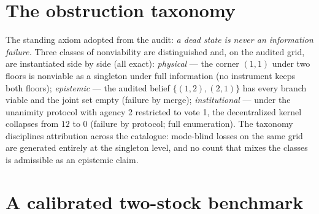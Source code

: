 \documentclass[10pt,twocolumn]{article}
\theoremstyle{plain}
\theoremstyle{definition}
\theoremstyle{remark}
\begin{document}
\section{The obstruction taxonomy}

The standing axiom adopted from the audit: \emph{a dead state is never an
information failure.} Three classes of nonviability are distinguished and,
on the audited grid, are instantiated side by side (all exact):
\emph{physical} --- the corner $(1,1)$ under two floors is nonviable as a
singleton under full information (no instrument keeps both floors);
\emph{epistemic} --- the audited belief $\{(1,2),(2,1)\}$ has every branch
viable and the joint set empty (failure by merge); \emph{institutional}
--- under the unanimity protocol with agency 2 restricted to vote 1, the
decentralized kernel collapses from $12$ to $0$ (failure by protocol;
full enumeration). The taxonomy disciplines attribution across the
catalogue: mode-blind losses on the same grid are generated entirely at the singleton level, and no count
that mixes the classes is admissible as an epistemic claim.

\section{A calibrated two-stock benchmark}
\end{document}
